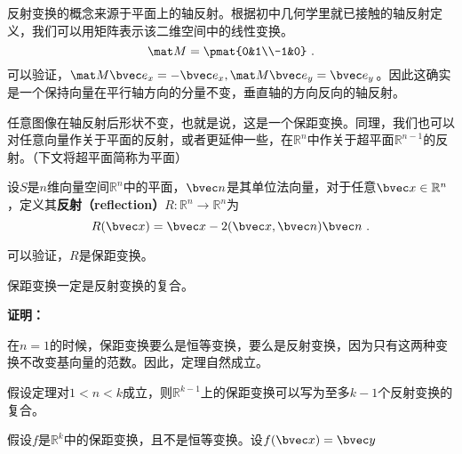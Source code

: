 反射变换的概念来源于平面上的轴反射。根据初中几何学里就已接触的轴反射定义，我们可以用矩阵表示该二维空间中的线性变换。
\begin{equation}
\mat M=\pmat{0&1\\-1&0}~.
\end{equation}
可以验证，$\mat M\bvec e_x=-\bvec e_x,\mat M \bvec e_y=\bvec e_y$。因此这确实是一个保持向量在平行轴方向的分量不变，垂直轴的方向反向的轴反射。

任意图像在轴反射后形状不变，也就是说，这是一个保距变换。同理，我们也可以对任意向量作关于平面的反射，或者更延伸一些，在$\mathbb R^n$中作关于超平面$\mathbb R^{n-1}$的反射。（下文将超平面简称为平面）
\begin{definition}{}
设$S$是$n$维向量空间$\mathbb R^n$中的平面，$\bvec n$是其单位法向量，对于任意$\bvec x\in \mathbb R^n$，定义其\textbf{反射（reflection）}$R:\mathbb R^n\rightarrow \mathbb R^n$为
\begin{equation}
R(\bvec x)=\bvec x-2(\bvec x,\bvec n)\bvec n~.
\end{equation}
\end{definition}
可以验证，$R$是保距变换。


\begin{theorem}{}
保距变换一定是反射变换的复合。
\end{theorem}
\textbf{证明：}

在$n=1$的时候，保距变换要么是恒等变换，要么是反射变换，因为只有这两种变换不改变基向量的范数。因此，定理自然成立。

假设定理对$1<n<k$成立，则$\mathbb R^{k-1}$上的保距变换可以写为至多$k-1$个反射变换的复合。 

假设$f$是$\mathbb R^k$中的保距变换，且不是恒等变换。设$f(\bvec x)=\bvec y$
